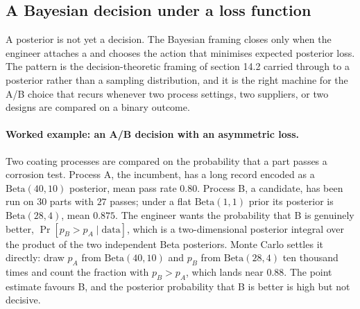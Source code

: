 \subsection{A Bayesian decision under a loss function}

A posterior is not yet a decision. The Bayesian framing closes only
when the engineer attaches a  and chooses the
action that minimises expected posterior loss. The pattern is the
decision-theoretic framing of section 14.2 carried through to a
posterior rather than a sampling distribution, and it is the right
machine for the A/B choice that recurs whenever two process settings,
two suppliers, or two designs are compared on a binary outcome.

\paragraph{Worked example: an A/B decision with an asymmetric loss.}
Two coating processes are compared on the probability that a part
passes a corrosion test. Process A, the incumbent, has a long record
encoded as a $\mathrm{Beta}(40, 10)$ posterior, mean pass rate
$0.80$. Process B, a candidate, has been run on $30$ parts with $27$
passes; under a flat $\mathrm{Beta}(1, 1)$ prior its posterior is
$\mathrm{Beta}(28, 4)$, mean $0.875$. The engineer wants the
probability that B is genuinely better, $\Pr[p_{B} > p_{A} \mid
\text{data}]$, which is a two-dimensional posterior integral over the
product of the two independent Beta posteriors. Monte Carlo settles
it directly: draw $p_{A}$ from $\mathrm{Beta}(40, 10)$ and $p_{B}$
from $\mathrm{Beta}(28, 4)$ ten thousand times and count the fraction
with $p_{B} > p_{A}$, which lands near $0.88$. The point estimate
favours B, and the posterior probability that B is better is high but
not decisive.

